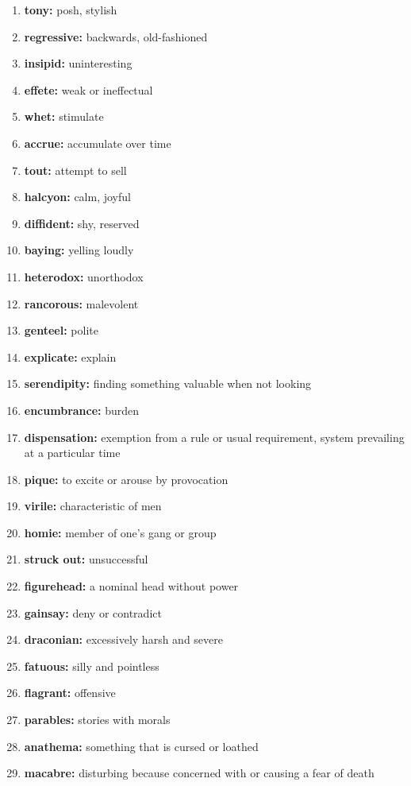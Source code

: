 \documentclass{article}
\begin{document}
\begin{enumerate}
    \item \textbf{tony: }{posh, stylish}
    \item \textbf{regressive: }{backwards, old-fashioned}
    \item \textbf{insipid: }{uninteresting}
    \item \textbf{effete: }{weak or ineffectual}
    \item \textbf{whet: }{stimulate}
    \item \textbf{accrue: }{accumulate over time}
    \item \textbf{tout: }{attempt to sell}
    \item \textbf{halcyon: }{calm, joyful}
    \item \textbf{diffident: }{shy, reserved}
    \item \textbf{baying: }{yelling loudly}
    \item \textbf{heterodox: }{unorthodox}
    \item \textbf{rancorous: }{malevolent}
    \item \textbf{genteel: }{polite}
    \item \textbf{explicate: }{explain}
    \item \textbf{serendipity: }{finding something valuable when not looking}
    \item \textbf{encumbrance: }{burden}
    \item \textbf{dispensation: }{exemption from a rule or usual requirement, system prevailing at a particular time}
    \item \textbf{pique: }{to excite or arouse by provocation}
    \item \textbf{virile: }{characteristic of men}
    \item \textbf{homie: }{member of one's gang or group}
    \item \textbf{struck out: }{unsuccessful}
    \item \textbf{figurehead: }{a nominal head without power}
    \item \textbf{gainsay: }{deny or contradict}
    \item \textbf{draconian: }{excessively harsh and severe}
    \item \textbf{fatuous: }{silly and pointless}
    \item \textbf{flagrant: }{offensive}
    \item \textbf{parables: }{stories with morals}
    \item \textbf{anathema: }{something that is cursed or loathed}
    \item \textbf{macabre: }{disturbing because concerned with or causing a fear of death}

\end{enumerate}
\end{document}
